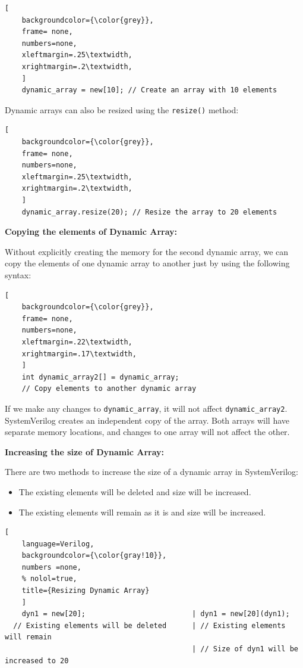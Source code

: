 \documentclass[12pt, a4paper]{article}
\begin{document}
\begin{lstlisting}[
    backgroundcolor={\color{grey}},
    frame= none,
    numbers=none,
    xleftmargin=.25\textwidth,
    xrightmargin=.2\textwidth, 
    ]
    dynamic_array = new[10]; // Create an array with 10 elements
\end{lstlisting}

Dynamic arrays can also be resized using the \texttt{resize()} method:

\begin{lstlisting}[
    backgroundcolor={\color{grey}},
    frame= none,
    numbers=none,
    xleftmargin=.25\textwidth,
    xrightmargin=.2\textwidth, 
    ]
    dynamic_array.resize(20); // Resize the array to 20 elements
\end{lstlisting}

\vspace{1em}
\textbf{Copying the elements of Dynamic Array:}

Without explicitly creating the memory for the second dynamic array, we can copy the elements of one dynamic array to another just by using the following syntax:
\begin{lstlisting}[
    backgroundcolor={\color{grey}},
    frame= none,
    numbers=none,
    xleftmargin=.22\textwidth,
    xrightmargin=.17\textwidth, 
    ]
    int dynamic_array2[] = dynamic_array; 
    // Copy elements to another dynamic array
\end{lstlisting}

If we make any changes to \texttt{dynamic\_array}, it will not affect \texttt{dynamic\_array2}. SystemVerilog creates an independent copy of the array. Both arrays will have separate memory locations, and changes to one array will not affect the other.

\vspace{1em}

\textbf{Increasing the size of Dynamic Array:}

There are two methods to increase the size of a dynamic array in SystemVerilog:
\begin{itemize}
    \item The existing elements will be deleted and size will be increased.
    \item The existing elements will remain as it is and size will be increased.
\end{itemize}

\begin{lstlisting}[
    language=Verilog,
    backgroundcolor={\color{gray!10}},
    numbers =none,
    % nolol=true,
    title={Resizing Dynamic Array}
    ]
    dyn1 = new[20];                         | dyn1 = new[20](dyn1);
  // Existing elements will be deleted      | // Existing elements will remain
                                            | // Size of dyn1 will be increased to 20
\end{lstlisting}
\end{document}
